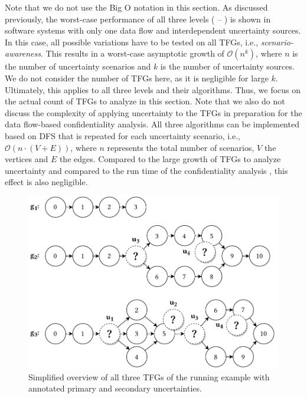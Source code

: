 Note that we do not use the Big O notation \cite{knuth_art_1997} in this section.
As discussed previously, the worst-case performance of all three levels ( -- ) is shown in software systems with only one data flow and interdependent uncertainty sources.
In this case, all possible variations have to be tested on all \acp{TFG}, i.e., \emph{scenario-awareness}.
This results in a worst-case asymptotic growth of $\mathcal{O}(n^k)$, where $n$ is the number of uncertainty scenarios and $k$ is the number of uncertainty sources.
We do not consider the number of \acp{TFG} here, as it is negligible for large $k$.
Ultimately, this applies to all three levels and their algorithms.
Thus, we focus on the actual count of \acp{TFG} to analyze in this section.
Note that we also do not discuss the complexity of applying uncertainty to the \acp{TFG} in preparation for the data flow-based confidentiality analysis.
All three algorithms can be implemented based on \acf{DFS} that is repeated for each uncertainty scenario, i.e., $\mathcal{O}(n \cdot (V + E))$, where $n$ represents the total number of scenarios, $V$ the vertices and $E$ the edges.
Compared to the large growth of \acp{TFG} to analyze uncertainty and compared to the run time of the confidentiality analysis \cite{schwickerath_tool-supported_2023}, this effect is also negligible.

\begin{figure}
    \centering
    \includegraphics[width=\textwidth]{figures/chapter7/alltfgs.pdf}
    \caption{Simplified overview of all three \acfp*{TFG} of the running example with annotated primary and secondary uncertainties.}
    \label{fig:confidentialityanalysis:alltfgs}
\end{figure}

